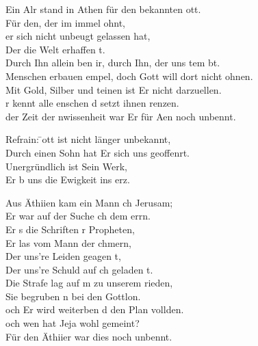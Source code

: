 
Ein Alr stand in Athen für den bekannten ott.\\
Für den, der im immel ohnt,\\
er sich nicht unbeugt gelassen hat,\\
Der die Welt erhaffen t.\\
Durch Ihn allein ben ir, durch Ihn, der uns tem bt.\\
Menschen erbauen empel, doch Gott will dort nicht ohnen.\\
Mit Gold, Silber und teinen ist Er nicht darzuellen.\\
r kennt alle enschen d setzt ihnen renzen.\\
 der Zeit der nwissenheit war Er für Aen noch unbennt.

\begin{tabbing}
Refrain: \= 	ott ist nicht länger unbekannt,\\
	\> 	Durch einen Sohn hat Er sich uns geoffenrt.\\
	\> 	Unergründlich ist Sein Werk,\\
	\> 	Er b uns die Ewigkeit ins erz.
\end{tabbing} 

Aus Äthiien kam ein Mann ch Jerusam;\\
Er war auf der Suche ch dem errn.\\
Er s die Schriften r Propheten,\\ 
Er las vom Mann der chmern,\\
Der uns're Leiden geagen t,\\
Der uns're Schuld auf ch geladen t.\\
Die Strafe lag auf m zu unserem rieden,\\
Sie begruben n bei den Gottlon.\\
och Er wird weiterben d den Plan vollden.\\
och wen hat Jeja wohl gemeint?\\
Für den Äthiier war dies noch unbennt.\\

